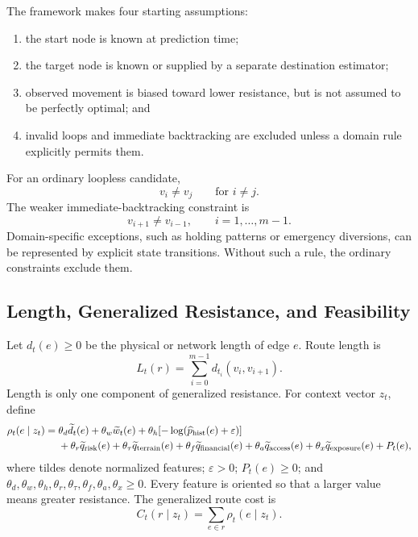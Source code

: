 \documentclass[11pt,letterpaper]{article}
\begin{document}
The framework makes four starting assumptions:

\begin{enumerate}
  \item the start node is known at prediction time;
  \item the target node is known or supplied by a separate destination estimator;
  \item observed movement is biased toward lower resistance, but is not assumed to be perfectly optimal; and
  \item invalid loops and immediate backtracking are excluded unless a domain rule explicitly permits them.
\end{enumerate}

For an ordinary loopless candidate,
\begin{equation}
v_i\neq v_j \qquad \text{for } i\neq j.
\end{equation}
The weaker immediate-backtracking constraint is
\begin{equation}
v_{i+1}\neq v_{i-1}, \qquad i=1,\ldots,m-1.
\end{equation}
Domain-specific exceptions, such as holding patterns or emergency diversions, can be represented by explicit state transitions. Without such a rule, the ordinary constraints exclude them.

\subsection{Length, Generalized Resistance, and Feasibility}

Let $d_t(e)\geq 0$ be the physical or network length of edge $e$. Route length is
\begin{equation}
L_t(r)=\sum_{i=0}^{m-1}d_{t_i}(v_i,v_{i+1}).
\end{equation}
Length is only one component of generalized resistance. For context vector $z_t$, define
\begin{align}
\rho_t(e\mid z_t)={}&\theta_d\widetilde d_t(e)+\theta_w\widetilde w_t(e)
+\theta_h[-\log(\widehat p_{\mathrm{hist}}(e)+\varepsilon)] \notag\\
&+\theta_r\widetilde q_{\mathrm{risk}}(e)
+\theta_\tau\widetilde q_{\mathrm{terrain}}(e)
+\theta_f\widetilde q_{\mathrm{financial}}(e)
+\theta_a\widetilde q_{\mathrm{access}}(e)
+\theta_x\widetilde q_{\mathrm{exposure}}(e)+P_t(e),
\end{align}
where tildes denote normalized features; $\varepsilon>0$; $P_t(e)\geq0$; and $\theta_d,\theta_w,\theta_h,\theta_r,\theta_\tau,\theta_f,\theta_a,\theta_x\geq0$. Every feature is oriented so that a larger value means greater resistance. The generalized route cost is
\begin{equation}
C_t(r\mid z_t)=\sum_{e\in r}\rho_t(e\mid z_t).
\end{equation}
\end{document}
